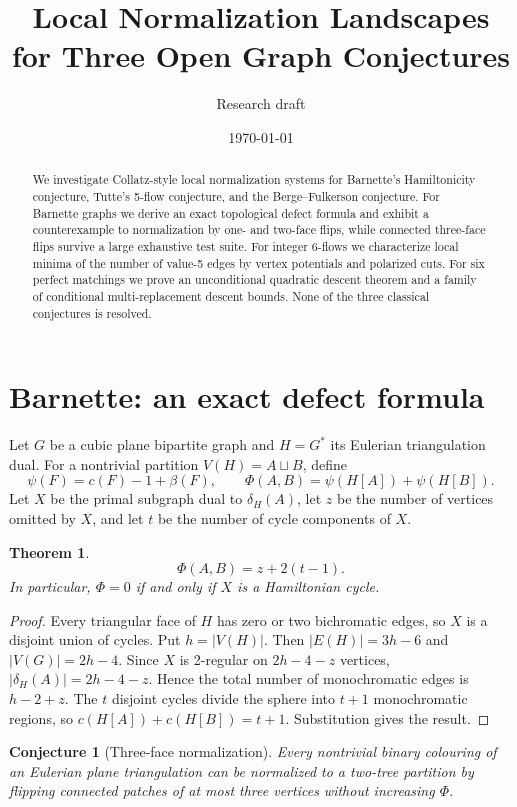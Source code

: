 \documentclass[11pt]{article}
\title{Local Normalization Landscapes for Three Open Graph Conjectures}
\author{Research draft}
\date{\today}
\newtheorem{theorem}{Theorem}
\newtheorem{conjecture}{Conjecture}
\begin{document}
\maketitle

\begin{abstract}
We investigate Collatz-style local normalization systems for Barnette's
Hamiltonicity conjecture, Tutte's 5-flow conjecture, and the
Berge--Fulkerson conjecture.  For Barnette graphs we derive an exact
topological defect formula and exhibit a counterexample to normalization
by one- and two-face flips, while connected three-face flips survive a
large exhaustive test suite.  For integer 6-flows we characterize local
minima of the number of value-5 edges by vertex potentials and polarized
cuts.  For six perfect matchings we prove an unconditional quadratic
descent theorem and a family of conditional multi-replacement descent
bounds.  None of the three classical conjectures is resolved.
\end{abstract}

\section{Barnette: an exact defect formula}
Let $G$ be a cubic plane bipartite graph and $H=G^*$ its Eulerian
triangulation dual.  For a nontrivial partition $V(H)=A\sqcup B$, define
\[
 \psi(F)=c(F)-1+\beta(F),\qquad
 \Phi(A,B)=\psi(H[A])+\psi(H[B]).
\]
Let $X$ be the primal subgraph dual to $\delta_H(A)$, let $z$ be the
number of vertices omitted by $X$, and let $t$ be the number of cycle
components of $X$.

\begin{theorem}
\[
 \Phi(A,B)=z+2(t-1).
\]
In particular, $\Phi=0$ if and only if $X$ is a Hamiltonian cycle.
\end{theorem}

\begin{proof}
Every triangular face of $H$ has zero or two bichromatic edges, so $X$
is a disjoint union of cycles.  Put $h=|V(H)|$.  Then
$|E(H)|=3h-6$ and $|V(G)|=2h-4$.  Since $X$ is 2-regular on
$2h-4-z$ vertices, $|\delta_H(A)|=2h-4-z$.  Hence the total number of
monochromatic edges is $h-2+z$.  The $t$ disjoint cycles divide the sphere
into $t+1$ monochromatic regions, so $c(H[A])+c(H[B])=t+1$.
Substitution gives the result.
\end{proof}

\begin{conjecture}[Three-face normalization]
Every nontrivial binary colouring of an Eulerian plane triangulation can
be normalized to a two-tree partition by flipping connected patches of
at most three vertices without increasing $\Phi$.
\end{conjecture}
\end{document}
